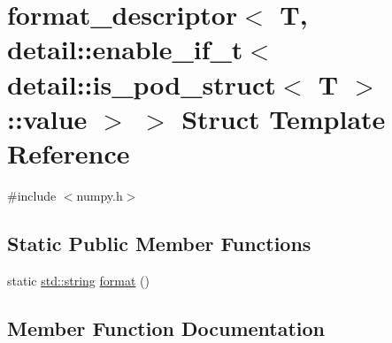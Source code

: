 \hypertarget{structformat__descriptor_3_01_t_00_01detail_1_1enable__if__t_3_01detail_1_1is__pod__struct_3_01_t_01_4_1_1value_01_4_01_4}{}\section{format\+\_\+descriptor$<$ T, detail\+::enable\+\_\+if\+\_\+t$<$ detail\+::is\+\_\+pod\+\_\+struct$<$ T $>$\+::value $>$ $>$ Struct Template Reference}
\label{structformat__descriptor_3_01_t_00_01detail_1_1enable__if__t_3_01detail_1_1is__pod__struct_3_01_t_01_4_1_1value_01_4_01_4}


{\ttfamily \#include $<$numpy.\+h$>$}

\subsection*{Static Public Member Functions}
\begin{DoxyCompactItemize}
\item 
static \mbox{\hyperlink{_s_d_l__opengl__glext_8h_ab4ccfaa8ab0e1afaae94dc96ef52dde1}{std\+::string}} \mbox{\hyperlink{structformat__descriptor_3_01_t_00_01detail_1_1enable__if__t_3_01detail_1_1is__pod__struct_3_01_t_01_4_1_1value_01_4_01_4_a9fb2753e0a41765a59d716a27e199bd6}{format}} ()
\end{DoxyCompactItemize}


\subsection{Member Function Documentation}
\mbox{\label{structformat__descriptor_3_01_t_00_01detail_1_1enable__if__t_3_01detail_1_1is__pod__struct_3_01_t_01_4_1_1value_01_4_01_4_a9fb2753e0a41765a59d716a27e199bd6}} 
